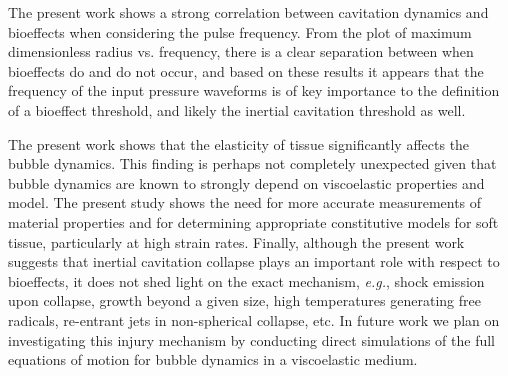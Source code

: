 The present work shows a strong correlation between cavitation dynamics and bioeffects
when considering the pulse frequency.
From the plot of maximum
dimensionless radius vs. frequency, there is a clear separation
between when bioeffects do and do not occur, and based on these
results it appears that the frequency of the input pressure waveforms
is of key importance to the definition of a bioeffect threshold, and
likely the inertial cavitation threshold as well. 

The present work shows that the elasticity of tissue significantly
affects the bubble dynamics. This finding is perhaps not completely
unexpected given that bubble dynamics are known to strongly depend
on viscoelastic properties and model. The present study shows the need
for more accurate measurements of material properties and for
determining appropriate constitutive models for soft tissue,
particularly at high strain rates. Finally, although the present work
suggests that inertial cavitation collapse plays an important role with respect
to bioeffects, it does not shed light on the exact mechanism,
\emph{e.g.}, shock emission upon collapse, growth beyond a given size,
high temperatures generating free radicals, re-entrant jets in
non-spherical collapse, etc.  In future work we plan on investigating 
this injury mechanism by conducting direct simulations of
the full equations of motion for bubble dynamics in a viscoelastic medium.


